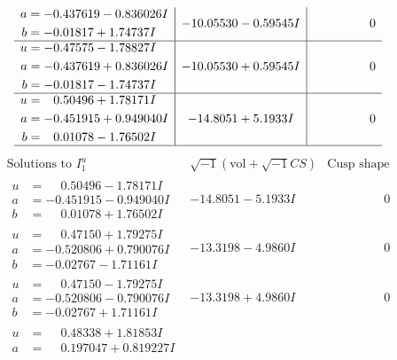 \documentclass[1p]{elsarticle_modified}
\theoremstyle{definition}
\newcommand{\I}{\sqrt{-1}}
\begin{document}
$$\begin{array}{c|c|c}
\begin{aligned}
a &= -0.437619 - 0.836026 I \\
b &= -0.01817 + 1.74737 I\end{aligned}
 & -10.05530 - 0.59545 I & \phantom{-0.000000 } 0 \\ \hline\begin{aligned}
u &= -0.47575 - 1.78827 I \\
a &= -0.437619 + 0.836026 I \\
b &= -0.01817 - 1.74737 I\end{aligned}
 & -10.05530 + 0.59545 I & \phantom{-0.000000 } 0 \\ \hline\begin{aligned}
u &= \phantom{-}0.50496 + 1.78171 I \\
a &= -0.451915 + 0.949040 I \\
b &= \phantom{-}0.01078 - 1.76502 I\end{aligned}
 & -14.8051 + 5.1933 I & \phantom{-0.000000 } 0\\
 \hline 
 \end{array}$$\newpage$$\begin{array}{c|c|c}  
\text{Solutions to }I^u_{1}& \I (\text{vol} + \sqrt{-1}CS) & \text{Cusp shape}\\
 \hline 
\begin{aligned}
u &= \phantom{-}0.50496 - 1.78171 I \\
a &= -0.451915 - 0.949040 I \\
b &= \phantom{-}0.01078 + 1.76502 I\end{aligned}
 & -14.8051 - 5.1933 I & \phantom{-0.000000 } 0 \\ \hline\begin{aligned}
u &= \phantom{-}0.47150 + 1.79275 I \\
a &= -0.520806 + 0.790076 I \\
b &= -0.02767 - 1.71161 I\end{aligned}
 & -13.3198 - 4.9860 I & \phantom{-0.000000 } 0 \\ \hline\begin{aligned}
u &= \phantom{-}0.47150 - 1.79275 I \\
a &= -0.520806 - 0.790076 I \\
b &= -0.02767 + 1.71161 I\end{aligned}
 & -13.3198 + 4.9860 I & \phantom{-0.000000 } 0 \\ \hline\begin{aligned}
u &= \phantom{-}0.48338 + 1.81853 I \\
a &= \phantom{-}0.197047 + 0.819227 I \\

\end{aligned}
\end{array}$$
\end{document}
